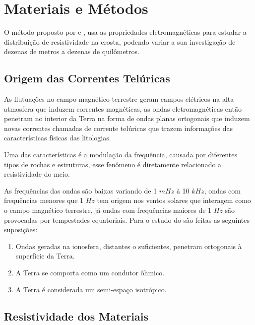 \chapter{Materiais e Métodos}
    \label{cap-materiais}    
    
    O método \MT proposto por \citeauthor{tikhonov50} \citeyearpar{tikhonov50} e
    \citeauthor{cagniard53} \citeyearpar{cagniard53}, usa as propriedades
    eletromagnéticas para estudar a distribuição de resistividade na crosta, 
    podendo variar a sua investigação de dezenas de metros a dezenas de 
    quilômetros.
    
    \section{Origem das Correntes Telúricas}
    
    As flutuações no campo magnético terrestre geram campos elétricos na alta atmosfera que induzem correntes magnéticas, as ondas eletromagnéticas então penetram no interior da Terra na forma de ondas planas ortogonais que induzem novas correntes chamadas de corrente telúricas que trazem informações das características físicas das litologias. 
    
    Uma das características é a modulação da frequência, causada por diferentes tipos de rochas e estruturas, esse fenômeno é diretamente 
	relacionado a resistividade do meio.
    
    As frequências das ondas são baixas variando de 1 $mHz$ à 10 $kHz$, ondas com frequências menores que 1 $Hz$ tem origem nos ventos solares que interagem como o campo magnético terrestre, já ondas com frequências maiores de 1 $Hz$ são provocadas por tempestades equatoriais. Para o estudo do \MT são feitas as seguintes suposições:
    
    \begin{enumerate}
	    \item Ondas geradas na ionosfera, distantes o suficientes, penetram ortogonais à superfície da Terra.	    
	    \item A Terra se comporta como um condutor ôhmico.
	    \item A Terra é considerada um semi-espaço isotrópico.
	\end{enumerate}   
    
    
    \section{Resistividade dos Materiais}
    

